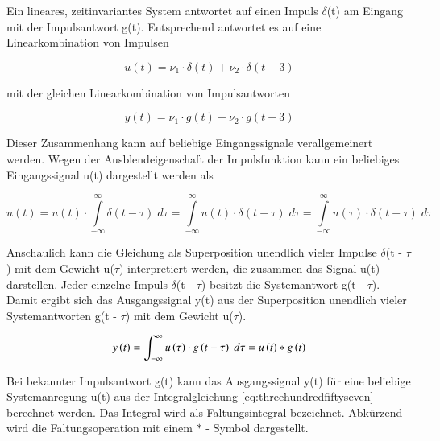 \noindent Ein lineares, zeitinvariantes System antwortet auf einen Impuls $\delta$(t) am Eingang mit der Impulsantwort g(t). Entsprechend antwortet es auf eine Linearkombination von Impulsen

\begin{equation}\label{eq:threehundredfiftyfour}
u\left(t\right)=\nu _{1} \cdot \delta \left(t\right)+\nu _{2} \cdot \delta \left(t-3\right)
\end{equation}

\noindent mit der gleichen Linearkombination von Impulsantworten

\begin{equation}\label{eq:threehundredfiftyfive}
y\left(t\right)=\nu _{1} \cdot g\left(t\right)+\nu _{2} \cdot g\left(t-3\right)
\end{equation}

\noindent Dieser Zusammenhang kann auf beliebige Eingangssignale verallgemeinert werden. Wegen der Ausblendeigenschaft der Impulsfunktion kann ein beliebiges Eingangssignal u(t) dargestellt werden als 

\begin{equation}\label{eq:threehundredfiftysix}
u\left(t\right)=u\left(t\right)\cdot \int\limits _{-\infty }^{\infty }\delta \left(t-\tau \right)\;d\tau  =\int\limits _{-\infty }^{\infty }u\left(t\right)\cdot \delta \left(t-\tau \right)\;d\tau  =\int\limits _{-\infty }^{\infty }u\left(\tau \right)\cdot \delta \left(t-\tau \right)\;d\tau 
\end{equation}

\noindent Anschaulich kann die Gleichung als Superposition unendlich vieler Impulse $\delta$(t - $\tau$) mit dem Gewicht u($\tau$) interpretiert werden, die zusammen das Signal u(t) darstellen. Jeder einzelne Impuls $\delta$(t - $\tau$) besitzt die Systemantwort g(t - $\tau$). Damit ergibt sich das Ausgangssignal y(t) aus der Superposition unendlich vieler Systemantworten g(t - $\tau$) mit dem Gewicht u($\tau$).

\begin{equation}\label{eq:threehundredfiftyseven}
y\left(t\right)=\int _{-\infty }^{\infty }u\left(\tau \right)\cdot g\left(t-\tau \right){\rm \; }d\tau  =u\left(t\right)*g\left(t\right)
\end{equation}

\noindent Bei bekannter Impulsantwort g(t) kann das Ausgangssignal y(t) für eine beliebige Systemanregung u(t) aus der Integralgleichung \eqref{eq:threehundredfiftyseven} berechnet werden. Das Integral wird als Faltungsintegral bezeichnet. Abkürzend wird die Faltungsoperation mit einem $*$ - Symbol dargestellt.

